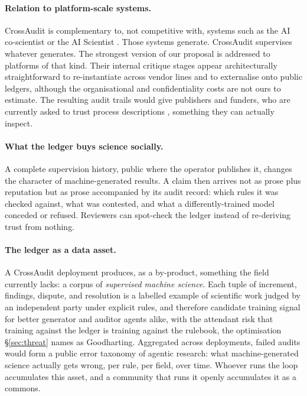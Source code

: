 \documentclass[11pt]{article}
\begin{document}
\paragraph{Relation to platform-scale systems.} CrossAudit is complementary to, not competitive with, systems such as the AI co-scientist \cite{gottweis2025coscientist} or the AI Scientist \cite{lu2026nature}. Those systems generate. CrossAudit supervises whatever generates. The strongest version of our proposal is addressed to platforms of that kind. Their internal critique stages appear architecturally straightforward to re-instantiate across vendor lines and to externalise onto public ledgers, although the organisational and confidentiality costs are not ours to estimate. The resulting audit trails would give publishers and funders, who are currently asked to trust process descriptions \cite{naturenews2026}, something they can actually inspect.

\paragraph{What the ledger buys science socially.} A complete supervision history, public where the operator publishes it, changes the character of machine-generated results. A claim then arrives not as prose plus reputation but as prose accompanied by its audit record: which rules it was checked against, what was contested, and what a differently-trained model conceded or refused. Reviewers can spot-check the ledger instead of re-deriving trust from nothing.

\paragraph{The ledger as a data asset.} A CrossAudit deployment produces, as a by-product, something the field currently lacks: a corpus of \emph{supervised machine science}. Each tuple of increment, findings, dispute, and resolution is a labelled example of scientific work judged by an independent party under explicit rules, and therefore candidate training signal for better generator and auditor agents alike, with the attendant risk that training against the ledger is training against the rulebook, the optimisation \S\ref{sec:threat} names as Goodharting. Aggregated across deployments, failed audits would form a public error taxonomy of agentic research: what machine-generated science actually gets wrong, per rule, per field, over time. Whoever runs the loop accumulates this asset, and a community that runs it openly accumulates it as a commons.
\end{document}
